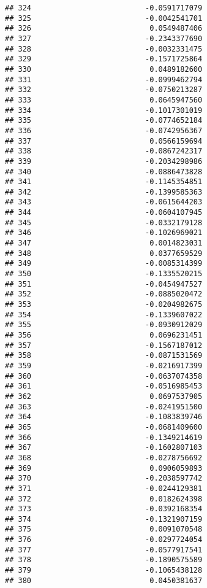 \documentclass[
]{article}
\begin{document}
\begin{verbatim}
## 324                          -0.0591717079
## 325                          -0.0042541701
## 326                           0.0549487406
## 327                          -0.2343377690
## 328                          -0.0032331475
## 329                          -0.1571725864
## 330                           0.0489182600
## 331                          -0.0999462794
## 332                          -0.0750213287
## 333                           0.0645947560
## 334                          -0.1017301019
## 335                          -0.0774652184
## 336                          -0.0742956367
## 337                           0.0566159694
## 338                          -0.0867242317
## 339                          -0.2034298986
## 340                          -0.0886473828
## 341                          -0.1145354851
## 342                          -0.1399585363
## 343                          -0.0615644203
## 344                          -0.0604107945
## 345                          -0.0332179128
## 346                          -0.1026969021
## 347                           0.0014823031
## 348                           0.0377659529
## 349                          -0.0085314399
## 350                          -0.1335520215
## 351                          -0.0454947527
## 352                          -0.0885020472
## 353                          -0.0204982675
## 354                          -0.1339607022
## 355                          -0.0930912029
## 356                           0.0696231451
## 357                          -0.1567187012
## 358                          -0.0871531569
## 359                          -0.0216917399
## 360                          -0.0637074358
## 361                          -0.0516985453
## 362                           0.0697537905
## 363                          -0.0241951500
## 364                          -0.1083839746
## 365                          -0.0681409600
## 366                          -0.1349214619
## 367                          -0.1602807103
## 368                          -0.0278756692
## 369                           0.0906059893
## 370                          -0.2038597742
## 371                          -0.0244129381
## 372                           0.0182624398
## 373                          -0.0392168354
## 374                          -0.1321907159
## 375                           0.0091070548
## 376                          -0.0297724054
## 377                          -0.0577917541
## 378                          -0.1890575589
## 379                          -0.1065438128
## 380                           0.0450381637

\end{verbatim}
\end{document}
